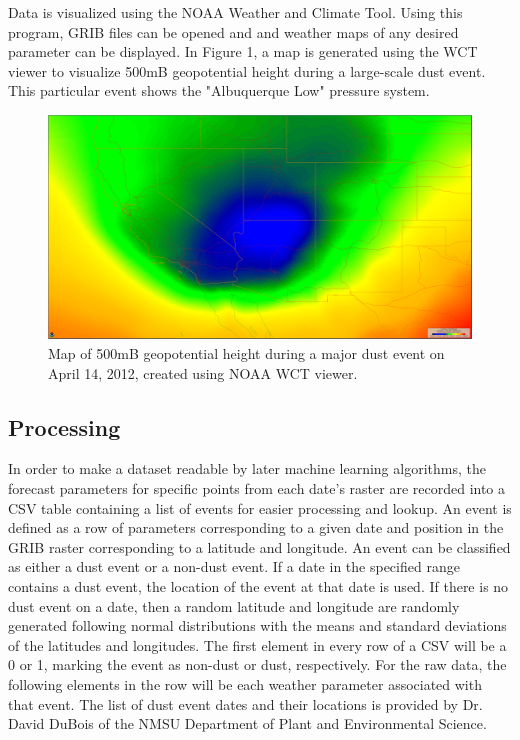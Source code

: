 \documentclass{article}
\begin{document}
Data is visualized using the NOAA Weather and Climate Tool. Using this program, GRIB files can be opened and and weather maps of any desired parameter can be displayed. In Figure 1, a map is generated using the WCT viewer to visualize 500mB geopotential height during a large-scale dust event. This particular event shows the "Albuquerque Low" pressure system.

\begin{figure}[H]
	\label{fig:map}
	\includegraphics[width=\textwidth]{images/abqlow.png}
	\caption{Map of 500mB geopotential height during a major dust event on April 14, 2012, created using NOAA WCT viewer.}
\end{figure}

\subsection{Processing}
In order to make a dataset readable by later machine learning algorithms, the forecast parameters for specific points from each date's raster are recorded into a CSV table containing a list of events for easier processing and lookup. An event is defined as a row of parameters corresponding to a given date and position in the GRIB raster corresponding to a latitude and longitude. An event can be classified as either a dust event or a non-dust event. If a date in the specified range contains a dust event, the location of the event at that date is used. If there is no dust event on a date, then a random latitude and longitude are randomly generated following normal distributions with the means and standard deviations of the latitudes and longitudes. The first element in every row of a CSV will be a 0 or 1, marking the event as non-dust or dust, respectively. For the raw data, the following elements in the row will be each weather parameter associated with that event. The list of dust event dates and their locations is provided by Dr. David DuBois of the NMSU Department of Plant and Environmental Science.
\end{document}
